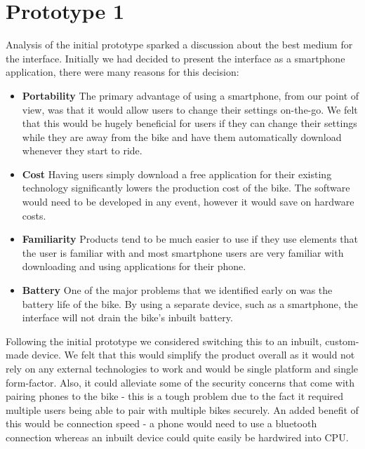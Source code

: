 \documentclass[a4paper]{report}
\begin{document}
{\section{Prototype 1}
\label{sec:phones}
Analysis of the initial prototype sparked a discussion about the best medium for the interface. Initially we had decided to present the interface as a smartphone application, there were many reasons for this decision:
\begin{itemize}
  \item \textbf{Portability} The primary advantage of using a smartphone, from our point of view, was that it would allow users to change their settings on-the-go. We felt that this would be hugely beneficial for users if they can change their settings while they are away from the bike and have them automatically download whenever they start to ride. 
  \item \textbf{Cost} Having users simply download a free application for their existing technology significantly lowers the production cost of the bike. The software would need to be developed in any event, however it would save on hardware costs. 
  \item \textbf{Familiarity} Products tend to be much easier to use if they use elements that the user is familiar with and most smartphone users are very familiar with downloading and using applications for their phone.
  \item \textbf{Battery} One of the major problems that we identified early on was the battery life of the bike. By using a separate device, such as a smartphone, the interface will not drain the bike's inbuilt battery.
\end{itemize}
Following the initial prototype we considered switching this to an inbuilt, custom-made device. We felt that this would simplify the product overall as it would not rely on any external technologies to work and would be single platform and single form-factor. Also, it could alleviate some of the security concerns that come with pairing phones to the bike - this is a tough problem due to the fact it required multiple users being able to pair with multiple bikes securely. An added benefit of this would be connection speed - a phone would need to use a bluetooth connection whereas an inbuilt device could quite easily be hardwired into CPU.

}
\end{document}
